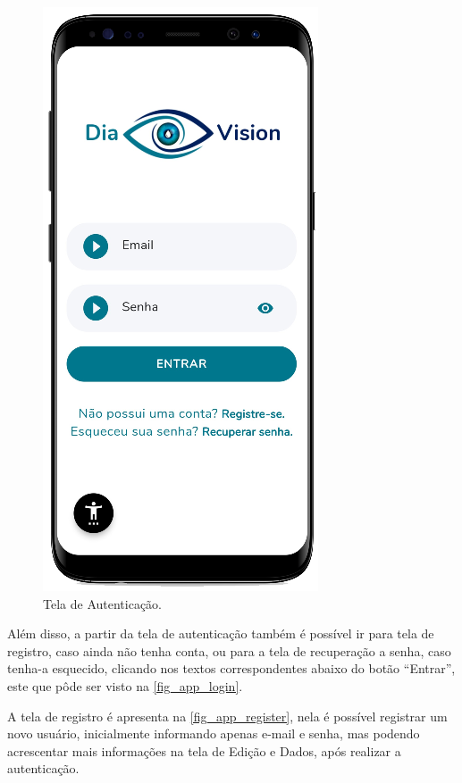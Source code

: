 \begin{figure}[htb]
    \caption{\label{fig_app_login}Tela de Autenticação.}
    \begin{center}
        \includegraphics[scale=0.70]{Imagens/desenvolvimento/app/app_login.png}
    \end{center}
\end{figure}

Além disso, a partir da tela de autenticação também é possível ir para tela de registro,
caso ainda não tenha conta, ou para a tela de recuperação a senha, caso tenha-a esquecido,
clicando nos textos correspondentes abaixo do botão ``Entrar'', este que pôde ser visto na
\autoref{fig_app_login}.

\newpage

A tela de registro é apresenta na \autoref{fig_app_register}, nela é possível registrar um novo usuário,
inicialmente informando apenas e-mail e senha, mas podendo acrescentar mais informações  na tela de Edição
e Dados, após realizar a autenticação.

